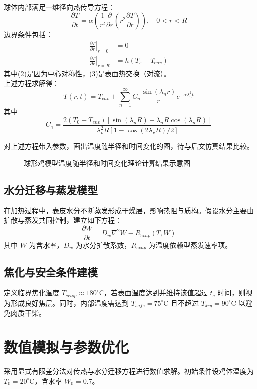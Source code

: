 \documentclass[12pt]{article}
\begin{document}
球体内部满足一维径向热传导方程：
\begin{equation}
\frac{\partial T}{\partial t} = \alpha \left( \frac{1}{r^2} \frac{\partial}{\partial r}\left(r^2 \frac{\partial T}{\partial r} \right) \right), \quad 0 < r < R
\end{equation}
边界条件包括：
\begin{align}
\left.\frac{\partial T}{\partial r}\right|_{r=0} &= 0 \\
\left.\frac{\partial T}{\partial r}\right|_{r=R} &= h(T_s - T_{env})
\end{align}
其中(2)是因为中心对称性，(3)是表面热交换（对流）。\\
上述方程求解得：\[ T(r, t)=T_{env}+\sum_{n=1}^{\infty} C_{n} \frac{\sin \left(\lambda_{n} r\right)}{r} e^{-\alpha \lambda_{n}^{2} t}\]
其中
\[ 
    C_n = \frac{2 (T_{0}-T_{env}) [\sin(\lambda_n R) - \lambda_n R \cos(\lambda_n R)]}{\lambda_n^2 R [1 - \cos(2\lambda_n R)/2]}
\]
$ $\\
\par 对上述方程带入参数，画出温度随半径和时间变化的图，待与后文仿真结果比较。

\begin{figure}[htbp]
\centering
\caption{球形鸡模型温度随半径和时间变化理论计算结果示意图}
\label{fig:analysis}
\end{figure}

\subsection{水分迁移与蒸发模型}
在加热过程中，表皮水分不断蒸发形成干燥层，影响热阻与质构。假设水分主要由扩散与蒸发共同控制，建立如下方程：
\begin{equation}
\frac{\partial W}{\partial t} = D_w \nabla^2 W - R_{evap}(T, W)
\end{equation}
其中 $W$ 为含水率，$D_w$ 为水分扩散系数，$R_{evap}$ 为温度依赖型蒸发速率项。

\subsection{焦化与安全条件建模}

定义临界焦化温度 $T_{crisp} \approx 180^\circ$C，若表面温度达到并维持该值超过 $t_c$ 时间，则视为形成良好焦层。同时，内部温度需达到 $T_{safe} = 75^\circ$C 且不超过 $T_{dry} = 90^\circ$C 以避免肉质干柴。

\section{数值模拟与参数优化}
采用显式有限差分法对传热与水分迁移方程进行数值求解。初始条件设鸡体温度为 $T_0 = 20^\circ$C，含水率 $W_0 = 0.7$。
\end{document}
